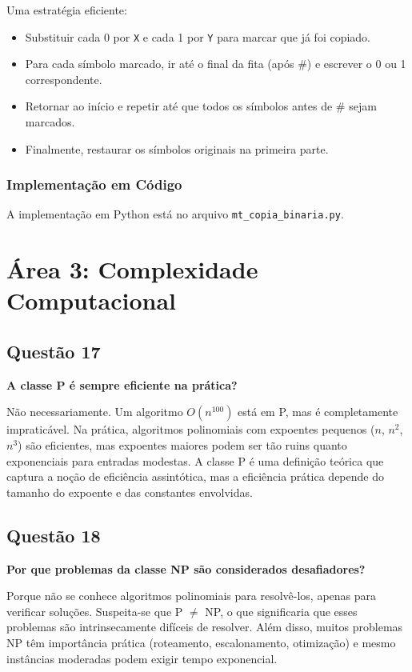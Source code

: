 \documentclass[conference]{IEEEtran}
\begin{document}
Uma estratégia eficiente:
\begin{itemize}
  \item Substituir cada 0 por \texttt{X} e cada 1 por \texttt{Y} para marcar que já foi copiado.
  \item Para cada símbolo marcado, ir até o final da fita (após \#) e escrever o 0 ou 1 correspondente.
  \item Retornar ao início e repetir até que todos os símbolos antes de \# sejam marcados.
  \item Finalmente, restaurar os símbolos originais na primeira parte.
\end{itemize}

\subsubsection{Implementação em Código}

A implementação em Python está no arquivo \texttt{mt\_copia\_binaria.py}.

\section{Área 3: Complexidade Computacional}

\subsection{Questão 17}
\textbf{A classe P é sempre eficiente na prática?}

Não necessariamente. Um algoritmo $O(n^{100})$ está em P, mas é completamente impraticável. Na prática, algoritmos polinomiais com expoentes pequenos ($n$, $n^2$, $n^3$) são eficientes, mas expoentes maiores podem ser tão ruins quanto exponenciais para entradas modestas. A classe P é uma definição teórica que captura a noção de eficiência assintótica, mas a eficiência prática depende do tamanho do expoente e das constantes envolvidas.

\subsection{Questão 18}
\textbf{Por que problemas da classe NP são considerados desafiadores?}

Porque não se conhece algoritmos polinomiais para resolvê-los, apenas para verificar soluções. Suspeita-se que P $\neq$ NP, o que significaria que esses problemas são intrinsecamente difíceis de resolver. Além disso, muitos problemas NP têm importância prática (roteamento, escalonamento, otimização) e mesmo instâncias moderadas podem exigir tempo exponencial.
\end{document}
